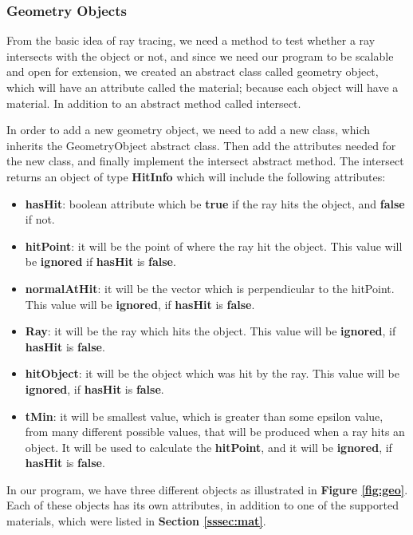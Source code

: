 \documentclass[a4paper]{report}
\begin{document}
	\subsubsection{Geometry Objects}
	\label{sssec:geo}From the basic idea of ray tracing, we need a method to test whether a ray intersects with the object or not, and since we need our program to be scalable and open for extension, we created an abstract class called geometry object, which will have an attribute called the material; because each object will have a material. In addition to an abstract method called intersect. \newline
	\par In order to add a new geometry object, we need to add a new class, which inherits the GeometryObject abstract class. Then add the attributes needed for the new class, and finally implement the intersect abstract method. The intersect returns an object of type \textbf{HitInfo} which will include the following attributes:
	\begin{itemize}
		\item \textbf{hasHit}: boolean attribute which be \textbf{true} if the ray hits the object, and \textbf{false} if not.
		\item \textbf{hitPoint}: it will be the point of where the ray hit the object. This value will be \textbf{ignored} if \textbf{hasHit} is \textbf{false}.
		\item \textbf{normalAtHit}: it will be the vector which is perpendicular to the hitPoint. This value will be \textbf{ignored}, if \textbf{hasHit} is \textbf{false}.
		\item \textbf{Ray}: it will be the ray which hits the object. This value will be \textbf{ignored}, if \textbf{hasHit} is \textbf{false}.
		\item \textbf{hitObject}: it will be the object which was hit by the ray. This value will be \textbf{ignored}, if \textbf{hasHit} is \textbf{false}.
		\item \textbf{tMin}: it will be smallest value, which is greater than some epsilon value, from many different possible values, that will be produced when a ray hits an object. It will be used to calculate the \textbf{hitPoint}, and it will be \textbf{ignored}, if \textbf{hasHit} is \textbf{false}.
	\end{itemize}
	\par In our program, we have three different objects as illustrated in \textbf{Figure \ref{fig:geo}}. Each of these objects has its own attributes, in addition to one of the supported materials, which were listed in \textbf{Section \ref{sssec:mat}}.
\end{document}
